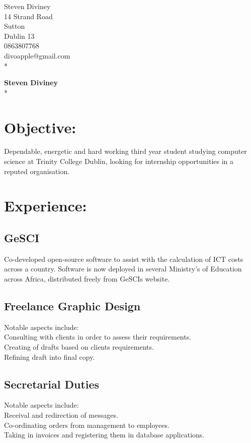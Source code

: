 \documentclass[a4paper,12pt]{article}
\begin{document}
\begin{flushright}
   Steven Diviney \\
   14 Strand Road \\
   Sutton \\
   Dublin 13 \\
   0863807768 \\
   divoapple@gmail.com \\* \vspace{10 mm}
\end{flushright}
\begin{flushleft}

{\LARGE\bf Steven Diviney} \\* \vspace{10mm}
\section{Objective:}    Dependable, energetic and hard working third year student studying computer science at Trinity College Dublin, looking for internship opportunities in a reputed organisation.
\section{Experience:}
\subsection{GeSCI} Co-developed open-source software to assist with the calculation of ICT costs across a country. Software is now deployed in several Ministry's of Education across Africa, distributed freely from GeSCIs website. 
\subsection{Freelance Graphic Design} Notable aspects include:\\
Consulting with clients in order to assess their requirements.\\
Creating of drafts based on clients requirements.\\
Refining draft into final copy.\\
\subsection{Secretarial Duties} Notable aspects include: \\
Receival and redirection of messages.\\
Co-ordinating orders from management to employees.\\
Taking in invoices and registering them in database applications.\\

\end{flushleft}
\end{document}
